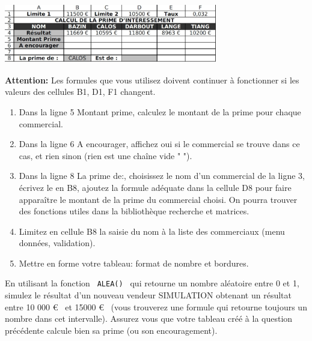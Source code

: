 \documentclass[a4paper]{article}
\newif\ifcorrection
\begin{document}
\centering\includegraphics[width=0.7\textwidth]{img/exemple.jpg}

\textbf{Attention:} Les formules que vous utilisez doivent continuer \`a fonctionner si les valeurs des cellules B1, D1, F1 changent.

\begin{enumerate}
 \item Dans la ligne 5 \og{}Montant prime\fg{}, calculez le montant de la prime pour chaque commercial.
 \ifcorrection
 \textcolor{red}{\verb?=IF(B4>B1,0.032*B4)? (fonction SI en Fr)}
 \fi
 \item Dans la ligne 6 \og{}A encourager\fg{}, affichez \og{}oui\fg{} si le commercial se trouve dans ce cas, et rien sinon (rien est une cha\^ine vide " ").
 \ifcorrection
 \textcolor{red}{\verb?=IF(B4<D1,"OUI","")?   }
 \fi
 \item Dans la ligne 8 \og{}La prime de:\fg{}, choisissez le nom d'un commercial de la ligne 3, \'ecrivez le en B8, ajoutez la formule ad\'equate
 dans la cellule D8 pour faire appara\^itre le montant de la prime du commercial choisi. On pourra trouver des fonctions utiles dans la biblioth\`eque \og{}recherche et matrices\fg{}.
 \ifcorrection
 \textcolor{red}{\verb?=HLOOKUP(B7,B3:F5,3)?   (RECHERCHEH en Fr)}
 \fi
 \item Limitez en cellule B8 la saisie du nom \`a la liste des commerciaux (menu donn\'ees, validation).
 \ifcorrection
 \textcolor{red}{data/validity/cell range  (source: B3:F3) }
 \fi
 \item Mettre en forme votre tableau: format de nombre et bordures.
\end{enumerate}


\exost En utilisant la fonction \verb? ALEA() ? qui retourne un nombre al\'eatoire entre 0 et 1, simulez le r\'esultat
d'un nouveau vendeur \og{}SIMULATION\fg{} obtenant un r\'esultat entre 10 000 \euro~ et 15000 \euro ~
(vous trouverez une formule qui retourne toujours un nombre dans cet intervalle).
Assurez vous que votre tableau cr\'e\'e \`a la question pr\'ec\'edente calcule bien sa prime (ou son encouragement).

\end{document}
